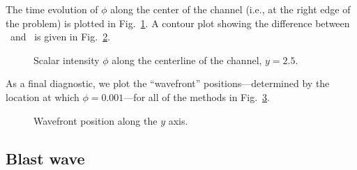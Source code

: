 The time evolution of $\phi$ along the center of the channel (i.e., at the
right edge of the problem) is plotted in Fig.~\ref{fig:tdReactor}. A contour
plot showing the difference between \Pone\ and \APone\ is given in
Fig.~\ref{fig:tdReactorContour}.

\begin{figure}[htb]
  \centering\small
  \subfloat[$t=2$]{%
    }%
  \subfloat[$t=5$]{%
    }

  \subfloat[$t=10$]{%
    }%
  \subfloat[$t=15$]{%
    }

  \caption{Scalar intensity $\phi$ along the centerline of the channel, $y=2.5$.}
  \label{fig:tdReactor}
\end{figure}

\begin{figure}[htb]
  \centering\small


  \label{fig:tdReactorContour}
\end{figure}

As a final diagnostic, we plot the ``wavefront'' positions---determined by the
location at which $\phi=0.001$---for all of the
methods in Fig.~\ref{fig:tdReactorWavefront}.

\begin{figure}[htb]
  \centering\small
  \subfloat[Channel, $y=2.5$]{%
    }

  \subfloat[Medium, $y=0$]{%
    }

  \caption{Wavefront position along the $y$ axis.}
  \label{fig:tdReactorWavefront}
\end{figure}

\clearpage
\subsection{Blast wave}

